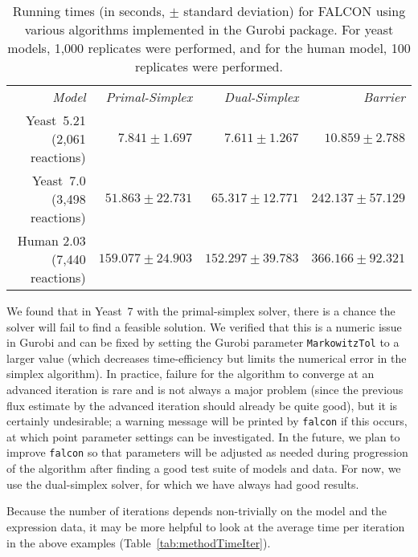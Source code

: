\begin{table}
\begin{center}
\begin{tabular}{rrrr}
\emph{Model}                 & \emph{Primal-Simplex} & \emph{Dual-Simplex} & \emph{Barrier} \\
Yeast~5.21 (2,061 reactions) & $ 7.841 \pm 1.697    $ & $ 7.611 \pm 1.267    $ & $ 10.859 \pm 2.788   $\\ 
Yeast~7.0 (3,498 reactions)  & $ 51.863 \pm 22.731  $ & $ 65.317 \pm 12.771  $ & $ 242.137 \pm 57.129 $\\
Human 2.03 (7,440 reactions) & $ 159.077 \pm 24.903 $ & $ 152.297 \pm 39.783 $ & $ 366.166 \pm 92.321 $\\
\end{tabular}
\end{center}
\caption{Running times (in seconds, $\pm$ standard deviation) for
  FALCON using various algorithms implemented in the Gurobi package.
  For yeast models, 1,000 replicates were performed, and for the human
  model, 100 replicates were performed.}
\label{tab:methodTime}
\end{table}

We found that in Yeast~7 with the primal-simplex solver, there is a
chance the solver will fail to find a feasible solution.
We verified that this is a numeric issue
in Gurobi and can be fixed by setting the Gurobi parameter
\texttt{MarkowitzTol} to a larger value (which decreases
time-efficiency but limits the numerical error in the
simplex algorithm). In practice, failure for the algorithm to converge
at an advanced iteration is rare and is not always a major problem (since the previous
flux estimate by the advanced iteration should already be quite good), but it
is certainly undesirable; a warning message will be printed by
\texttt{falcon} if this occurs, at which point parameter settings can
be investigated. In the future, we plan to improve \texttt{falcon} so
that parameters will be adjusted as needed during progression of the
algorithm after finding a good test suite of models and data. For now,
we use the dual-simplex solver, for which we have always had good
results.

Because the number of iterations depends non-trivially on the model
and the expression data, it may be more helpful to look at the 
average time per iteration in the above examples 
(\suppOrApp Table~\ref{tab:methodTimeIter}).

